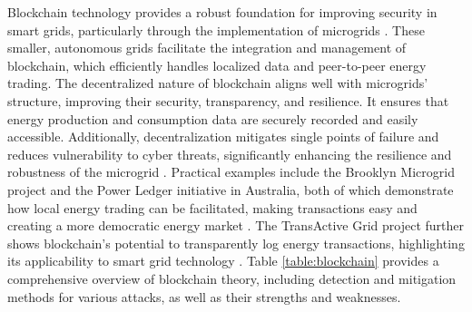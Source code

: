 \documentclass[10pt, journal]{IEEEtran}
\begin{document}
 
Blockchain technology provides a robust foundation for improving security in smart grids, particularly through the implementation of microgrids \cite{musleh2019blockchain, mollah2020blockchain}. These smaller, autonomous grids facilitate the integration and management of blockchain, which efficiently handles localized data and peer-to-peer energy trading. The decentralized nature of blockchain aligns well with microgrids' structure, improving their security, transparency, and resilience. It ensures that energy production and consumption data are securely recorded and easily accessible. Additionally, decentralization mitigates single points of failure and reduces vulnerability to cyber threats, significantly enhancing the resilience and robustness of the microgrid \cite{bani2018reliability}. Practical examples include the Brooklyn Microgrid project and the Power Ledger initiative in Australia, both of which demonstrate how local energy trading can be facilitated, making transactions easy and creating a more democratic energy market \cite{mengelkamp2018designing}. The TransActive Grid project further shows blockchain's potential to transparently log energy transactions, highlighting its applicability to smart grid technology \cite{orsini2019brooklyn}. Table \ref{table:blockchain} provides a comprehensive overview of blockchain theory, including detection and mitigation methods for various attacks, as well as their strengths and weaknesses.

\end{document}
